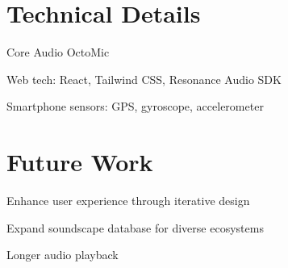 \documentclass[a4paper]{article}
\begin{document}
{    \section{Technical Details}
    \begin{compactitem}
        \item Core Audio OctoMic
        \item Web tech: React, Tailwind CSS, Resonance Audio SDK
        \item Smartphone sensors: GPS, gyroscope, accelerometer
    \end{compactitem}

    \section{Future Work}
    \begin{compactitem}
        \item Enhance user experience through iterative design
        \item Expand soundscape database for diverse ecosystems
        \item Longer audio playback
    \end{compactitem}
}
\end{document}
